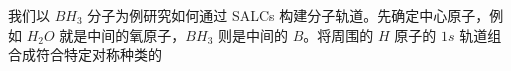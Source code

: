 
我们以 $BH_3$ 分子为例研究如何通过 SALCs 构建分子轨道。先确定中心原子，例如 $H_2O$ 就是中间的氧原子，$BH_3$ 则是中间的 $B$。将周围的 $H$ 原子的 $1s$ 轨道组合成符合特定对称种类的
